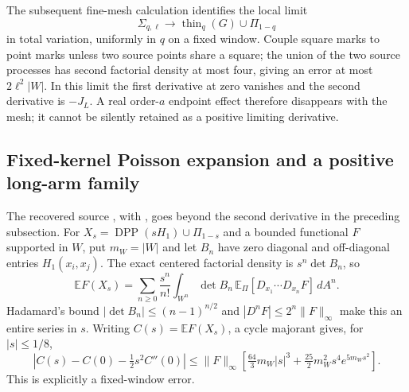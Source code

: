 \documentclass[11pt,a4paper]{article}
\theoremstyle{definition}
\theoremstyle{remark}
\numberwithin{equation}{section}
\begin{document}
The subsequent fine-mesh calculation identifies the local limit
\[
 \Sigma_{q,\ell}\longrightarrow
 \operatorname{thin}_q(G)\cup\Pi_{1-q}
\]
in total variation, uniformly in $q$ on a fixed window.  Couple square
marks to point marks unless two source points share a square; the union
of the two source processes has second factorial density at most four,
giving an error at most $2\ell^2|W|$.  In this limit the first derivative
at zero vanishes and the second derivative is $-J_L$.  A real order-$a$
endpoint effect therefore disappears with the mesh; it cannot be
silently retained as a positive limiting derivative.

\subsection{Fixed-kernel Poisson expansion and a positive long-arm family}
\label{br:fixed-kernel}

The recovered source
, with
, goes beyond the
second derivative in the preceding subsection. For
$X_s=\operatorname{DPP}(sH_1)\cup\Pi_{1-s}$ and a bounded functional
$F$ supported in $W$, put $m_W=|W|$ and let $B_n$ have zero diagonal
and off-diagonal entries $H_1(x_i,x_j)$. The exact centered factorial
density is $s^n\det B_n$, so
\begin{equation}\label{br:entire-expansion}
 \mathbb EF(X_s)=\sum_{n\ge0}\frac{s^n}{n!}
  \int_{W^n}\det B_n\,
       \mathbb E_\Pi[D_{x_1}\cdots D_{x_n}F]\,dA^n.
\end{equation}
Hadamard's bound $|\det B_n|\le(n-1)^{n/2}$ and
$|D^nF|\le2^n\|F\|_\infty$ make this an entire series in $s$.
Writing $C(s)=\mathbb EF(X_s)$, a cycle majorant gives, for
$|s|\le1/8$,
\[
 |C(s)-C(0)-\tfrac12s^2C''(0)|
 \le\|F\|_\infty
 \left[\tfrac{64}{3}m_W|s|^3+
       \tfrac{25}{2}m_W^2s^4e^{5m_Ws^2}\right].
\]
This is explicitly a fixed-window error.
\end{document}

